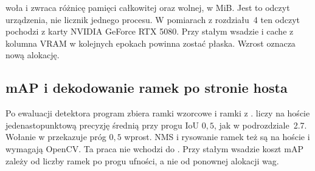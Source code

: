  woła  i zwraca różnicę pamięci całkowitej oraz wolnej, w MiB. Jest to odczyt urządzenia, nie licznik jednego procesu. W pomiarach z rozdziału~4 ten odczyt pochodzi z karty NVIDIA GeForce RTX 5080. Przy stałym wsadzie i cache z  kolumna VRAM w kolejnych epokach powinna zostać płaska. Wzrost oznacza nową alokację.

\subsection{mAP i dekodowanie ramek po stronie hosta}

Po ewaluacji detektora program zbiera ramki wzorcowe i ramki z .  liczy na hoście jedenastopunktową precyzję średnią przy progu IoU \(0{,}5\), jak w podrozdziale~2.7. Wołanie w  przekazuje próg \(0{,}5\) wprost. NMS i rysowanie ramek też są na hoście i wymagają OpenCV. Ta praca nie wchodzi do . Przy stałym wsadzie koszt mAP zależy od liczby ramek po progu ufności, a nie od ponownej alokacji wag.
